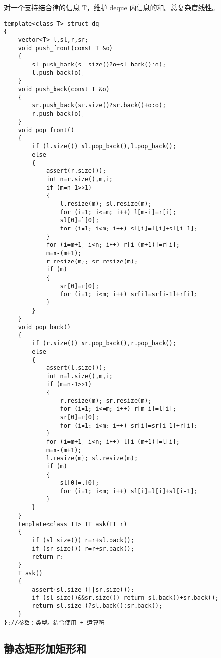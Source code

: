 \documentclass[12pt]{ctexart}
\begin{document}
对一个支持结合律的信息 T，维护 deque 内信息的和。总复杂度线性。

\begin{lstlisting}
template<class T> struct dq
{
	vector<T> l,sl,r,sr;
	void push_front(const T &o)
	{
		sl.push_back(sl.size()?o+sl.back():o);
		l.push_back(o);
	}
	void push_back(const T &o)
	{
		sr.push_back(sr.size()?sr.back()+o:o);
		r.push_back(o);
	}
	void pop_front()
	{
		if (l.size()) sl.pop_back(),l.pop_back();
		else
		{
			assert(r.size());
			int n=r.size(),m,i;
			if (m=n-1>>1)
			{
				l.resize(m); sl.resize(m);
				for (i=1; i<=m; i++) l[m-i]=r[i];
				sl[0]=l[0];
				for (i=1; i<m; i++) sl[i]=l[i]+sl[i-1];
			}
			for (i=m+1; i<n; i++) r[i-(m+1)]=r[i];
			m=n-(m+1);
			r.resize(m); sr.resize(m);
			if (m)
			{
				sr[0]=r[0];
				for (i=1; i<m; i++) sr[i]=sr[i-1]+r[i];
			}
		}
	}
	void pop_back()
	{
		if (r.size()) sr.pop_back(),r.pop_back();
		else
		{
			assert(l.size());
			int n=l.size(),m,i;
			if (m=n-1>>1)
			{
				r.resize(m); sr.resize(m);
				for (i=1; i<=m; i++) r[m-i]=l[i];
				sr[0]=r[0];
				for (i=1; i<m; i++) sr[i]=sr[i-1]+r[i];
			}
			for (i=m+1; i<n; i++) l[i-(m+1)]=l[i];
			m=n-(m+1);
			l.resize(m); sl.resize(m);
			if (m)
			{
				sl[0]=l[0];
				for (i=1; i<m; i++) sl[i]=l[i]+sl[i-1];
			}
		}
	}
	template<class TT> TT ask(TT r)
	{
		if (sl.size()) r=r+sl.back();
		if (sr.size()) r=r+sr.back();
		return r;
	}
	T ask()
	{
		assert(sl.size()||sr.size());
		if (sl.size()&&sr.size()) return sl.back()+sr.back();
		return sl.size()?sl.back():sr.back();
	}
};//参数：类型。结合使用 + 运算符

\end{lstlisting}

\subsection{静态矩形加矩形和}
\end{document}
